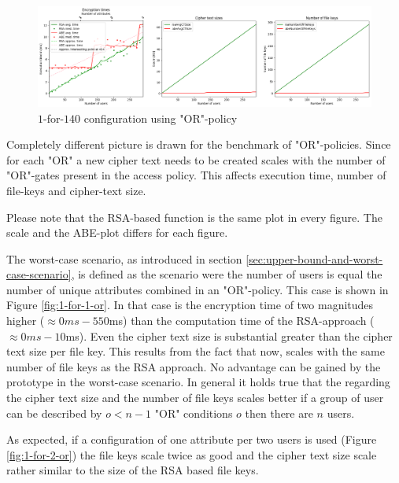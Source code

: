 \begin{figure}[!t]
\centering
    \includegraphics[width=\linewidth]{img/eval-or-policy/encrypt_incrementing_10_attribute_increment_1per140User.png}
    \caption{$1$-for-$140$ configuration using "OR"-policy}
    \label{fig:1-for-140-or}
\end{figure}

Completely different picture is drawn for the benchmark of "OR"-policies. Since for each "OR" a new cipher text needs to be created \name scales with the number of "OR"-gates present in the access policy. This affects execution time, number of file-keys and cipher-text size.




Please note that the RSA-based function is the same plot in every figure. The scale and the ABE-plot differs for each figure.  

The worst-case scenario, as introduced in section \ref{sec:upper-bound-and-worst-case-scenario}, is defined as the scenario were the number of users is equal the number of unique attributes combined in an "OR"-policy. This case is shown in Figure \ref{fig:1-for-1-or}. In that case is the encryption time of \name two magnitudes higher ($\approx 0ms-550$ms) than the computation time of the RSA-approach ($\approx 0ms-10$ms). Even the cipher text size is substantial greater than the cipher text size per file key. This results from the fact that now, \name scales with the same number of file keys as the RSA approach. No advantage can be gained by the prototype in the worst-case scenario. In general it holds true that the regarding the cipher text size and the number of file keys \name scales better if a group of user can be described by $o < n -1$ "OR" conditions $o$ then there are $n$ users.

As expected, if a configuration of one attribute per two users is used (Figure \ref{fig:1-for-2-or}) the file keys scale twice as good and the cipher text size scale rather similar to the size of the RSA based file keys. 

